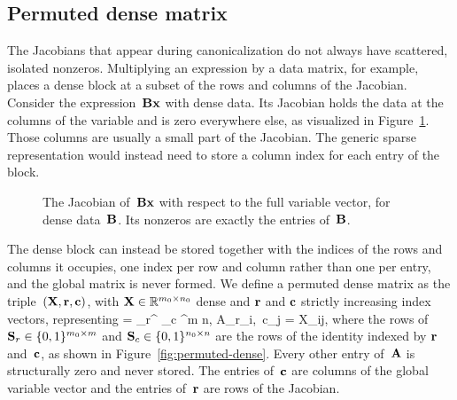 \subsection{Permuted dense matrix}\label{sec:theme1-permuted-dense}

The Jacobians that appear during canonicalization do not always have scattered, isolated
nonzeros. Multiplying an expression by a data matrix, for example, places a dense block at a
subset of the rows and columns of the Jacobian. Consider the expression~$\mathbf{B}\mathbf{x}$ with
dense data. Its Jacobian holds the data at the columns of the variable and is zero everywhere
else, as visualized in Figure~\ref{fig:pd-motivation}. Those columns are usually a small part
of the Jacobian.
The generic sparse representation would instead need to store a column index for each entry of
the block.


\begin{figure}[htbp]
\centering
{}
\caption{The Jacobian of~$\mathbf{B}\mathbf{x}$ with respect to the full variable vector, for
dense data~$\mathbf{B}$. Its nonzeros are exactly the entries of~$\mathbf{B}$.}
\label{fig:pd-motivation}
\end{figure}

The dense block can instead be stored together with the indices of the rows and columns it
occupies, one index per row and column rather than one per entry, and the global matrix is
never formed. We define a permuted dense matrix as the
triple~$(\mathbf{X}, \mathbf{r}, \mathbf{c})$, with $\mathbf{X} \in \mathbb{R}^{m_0 \times n_0}$ dense
and $\mathbf{r}$ and $\mathbf{c}$ strictly increasing index vectors, representing
\BEQ\label{eq:permuted-dense}
   = _r^\top {} _c \in \reals^{m \times n},
  \qquad A_{r_i,\, c_j} = X_{ij},
\EEQ
where the rows of $\mathbf{S}_r \in \{0,1\}^{m_0 \times m}$ and
$\mathbf{S}_c \in \{0,1\}^{n_0 \times n}$ are the rows of the identity indexed by $\mathbf{r}$
and~$\mathbf{c}$, as shown in Figure~\ref{fig:permuted-dense}. Every other entry of~$\mathbf{A}$ is
structurally zero and never stored. The entries of~$\mathbf{c}$ are columns of the global
variable vector and the entries of~$\mathbf{r}$ are rows of the Jacobian.

